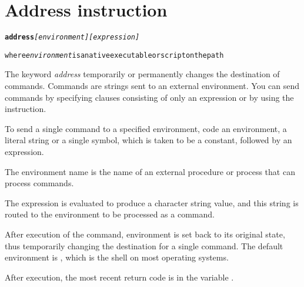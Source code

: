 \chapter{Address instruction}\label{refparse}
\begin{shaded}
\begin{alltt}
\textbf{address} \emph{[environment]} \emph{[expression]}

where \emph{environment} is a native executable or script on the path

\end{alltt}
\end{shaded}
The keyword \emph{address} temporarily or permanently changes the destination of commands. Commands are strings sent to an external environment. You can send commands by specifying clauses consisting of only an expression or by using the  instruction.

To send a single command to a specified environment, code an
environment, a literal string or a single symbol, which is taken to be
a constant, followed by an expression.

The environment name is the
name of an external procedure or process that can process
commands.

The expression is evaluated to produce a character string
value, and this string is routed to the environment to be processed as
a command.

After execution of the command, environment is set back to
its original state, thus temporarily changing the destination for a
single command. The default environment is , which is the shell
on most operating systems.

After execution, the most recent return code is in the variable .